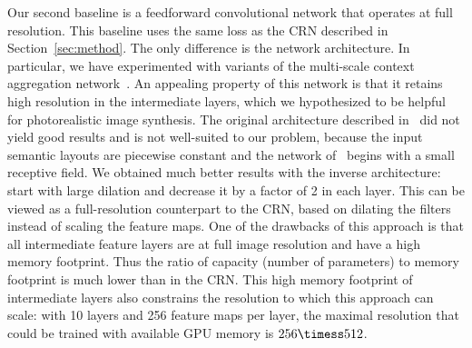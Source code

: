 Our second baseline is a feedforward convolutional network that operates at full resolution. This baseline uses the same loss as the CRN described in Section~\ref{sec:method}. The only difference is the network architecture. In particular, we have experimented with variants of the multi-scale context aggregation network~\cite{YuKoltun2016}. An appealing property of this network is that it retains high resolution in the intermediate layers, which we hypothesized to be helpful for photorealistic image synthesis. The original architecture described in~\cite{YuKoltun2016} did not yield good results and is not well-suited to our problem, because the input semantic layouts are piecewise constant and the network of~\cite{YuKoltun2016} begins with a small receptive field. We obtained much better results with the inverse architecture: start with large dilation and decrease it by a factor of 2 in each layer. This can be viewed as a full-resolution counterpart to the CRN, based on dilating the filters instead of scaling the feature maps. One of the drawbacks of this approach is that all intermediate feature layers are at full image resolution and have a high memory footprint. Thus the ratio of capacity (number of parameters) to memory footprint is much lower than in the CRN. This high memory footprint of intermediate layers also constrains the resolution to which this approach can scale: with 10 layers and 256 feature maps per layer, the maximal resolution that could be trained with available GPU memory is $256\timess 512$.


